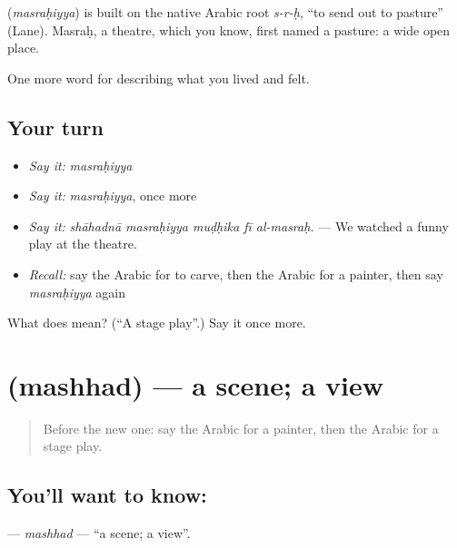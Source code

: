 \begin{cousinweb}
\textbf{} (\emph{masraḥiyya}) is built on the native Arabic root \emph{s-r-ḥ}, \textquotedblleft{}to send out to pasture\textquotedblright{} (Lane). Masraḥ, a theatre, which you know, first named a pasture: a wide open place.
\end{cousinweb}

\begin{grammarlens}[title={What you've built}]
One more word for describing what you lived and felt.
\end{grammarlens}

\subsection*{Your turn}
\begin{itemize}
\raggedright
  \item \emph{Say it:} \emph{masraḥiyya}
  \item \emph{Say it:} \emph{masraḥiyya}, once more
  \item \emph{Say it:} \emph{shāhadnā masraḥiyya muḍḥika fī al-masraḥ.} — We watched a funny play at the theatre.
  \item \emph{Recall:} say the Arabic for to carve, then the Arabic for a painter, then say \emph{masraḥiyya} again
\end{itemize}

\begin{tcolorbox}[breakable,colback=teal!4,colframe=teal!35!black,title={Before you move on}]
What does  mean? (\textquotedblleft{}A stage play\textquotedblright{}.) Say it once more.
\end{tcolorbox}
\section[\texorpdfstring{\ar{مشهد} (mashhad)}{مشهد (mashhad)}]{ (mashhad) — a scene; a view}

\label{lesson:AR-C542-mashhad}



\begin{quote}
Before the new one: say the Arabic for a painter, then the Arabic for a stage play.
\end{quote}

\subsection*{You'll want to know: }
\textbf{} — \emph{mashhad} — \textquotedblleft{}a scene; a view\textquotedblright{}.

